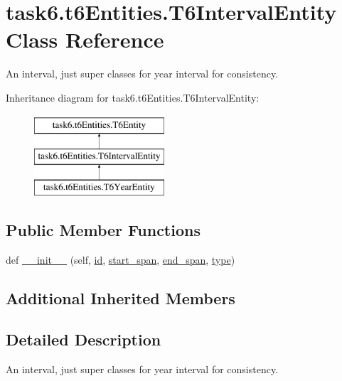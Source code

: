 \hypertarget{classtask6_1_1t6Entities_1_1T6IntervalEntity}{}\section{task6.\+t6\+Entities.\+T6\+Interval\+Entity Class Reference}
\label{classtask6_1_1t6Entities_1_1T6IntervalEntity}


An interval, just super classes for year interval for consistency.  


Inheritance diagram for task6.\+t6\+Entities.\+T6\+Interval\+Entity\+:\begin{figure}[H]
\begin{center}
\leavevmode
\includegraphics[height=3.000000cm]{classtask6_1_1t6Entities_1_1T6IntervalEntity}
\end{center}
\end{figure}
\subsection*{Public Member Functions}
\begin{DoxyCompactItemize}
\item 
def \hyperlink{classtask6_1_1t6Entities_1_1T6IntervalEntity_ac60a5e79fc1417b2447c865deeef4884}{\+\_\+\+\_\+init\+\_\+\+\_\+} (self, \hyperlink{classtask6_1_1t6Entities_1_1T6Entity_afeeced8134bb3ebe0cfecc64d0ab46a4}{id}, \hyperlink{classtask6_1_1t6Entities_1_1T6Entity_a52779e9af8864dc98e8b02fc5b9b041a}{start\+\_\+span}, \hyperlink{classtask6_1_1t6Entities_1_1T6Entity_aeb402200b156cd9562c5111dfe777b98}{end\+\_\+span}, \hyperlink{classtask6_1_1t6Entities_1_1T6Entity_ae4299399be3ecbd68dbb9ae988bff5a8}{type})
\end{DoxyCompactItemize}
\subsection*{Additional Inherited Members}


\subsection{Detailed Description}
An interval, just super classes for year interval for consistency. 

